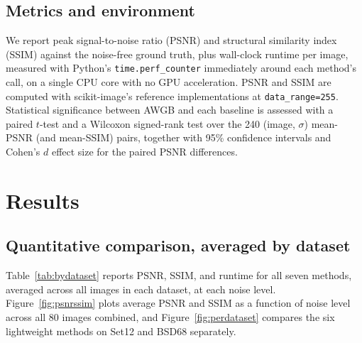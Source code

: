 \documentclass[final,3p,times,twocolumn,nopreprintline]{elsarticle}
\begin{document}
\subsection{Metrics and environment}
We report peak signal-to-noise ratio (PSNR) and structural similarity index (SSIM) against the noise-free ground truth, plus wall-clock runtime per image, measured with Python's \texttt{time.perf\_counter} immediately around each method's call, on a single CPU core with no GPU acceleration. PSNR and SSIM are computed with scikit-image's reference implementations at \texttt{data\_range=255}. Statistical significance between AWGB and each baseline is assessed with a paired $t$-test and a Wilcoxon signed-rank test over the 240 (image, $\sigma$) mean-PSNR (and mean-SSIM) pairs, together with 95\% confidence intervals and Cohen's $d$ effect size for the paired PSNR differences.

\section{Results}
\label{sec:results}

\subsection{Quantitative comparison, averaged by dataset}
Table~\ref{tab:bydataset} reports PSNR, SSIM, and runtime for all seven methods, averaged across all images in each dataset, at each noise level. Figure~\ref{fig:psnrssim} plots average PSNR and SSIM as a function of noise level across all 80 images combined, and Figure~\ref{fig:perdataset} compares the six lightweight methods on Set12 and BSD68 separately.
\end{document}
